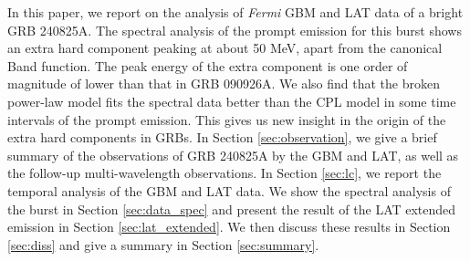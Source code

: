 \documentclass[twocolumn]{aastex631}
\begin{document}





In this paper, we report on the analysis of {\em Fermi} GBM and LAT data of a bright GRB 240825A. The spectral analysis of the prompt emission for this burst shows an extra hard component peaking at about 50 MeV, apart from the canonical Band function. The peak energy of the extra component is one order of magnitude of lower than that in GRB 090926A. We also find that the broken power-law model fits the spectral data better than the CPL model in some time intervals of the prompt emission. This gives us new insight in the origin of the extra hard components in GRBs.  
In Section \ref{sec:observation}, we give a brief summary of the observations of GRB 240825A by the
GBM and  LAT, as well as the follow-up multi-wavelength observations. 
In Section \ref{sec:lc}, we report the temporal analysis of the GBM and LAT data. 
We show the spectral analysis of the burst  in Section \ref{sec:data_spec} and present the result of the LAT extended emission in Section \ref{sec:lat_extended}.
We then discuss these results in Section \ref{sec:diss} and give a summary in Section \ref{sec:summary}.
\end{document}
